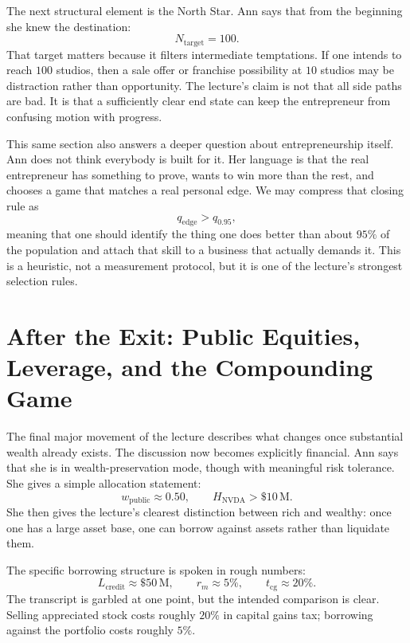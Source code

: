 The next structural element is the North Star. Ann says that from the beginning she knew the destination:
\begin{equation}
N_{\mathrm{target}} = 100.
\end{equation}
That target matters because it filters intermediate temptations. If one intends to reach \(100\) studios, then a sale offer or franchise possibility at \(10\) studios may be distraction rather than opportunity. The lecture's claim is not that all side paths are bad. It is that a sufficiently clear end state can keep the entrepreneur from confusing motion with progress.

This same section also answers a deeper question about entrepreneurship itself. Ann does not think everybody is built for it. Her language is that the real entrepreneur has something to prove, wants to win more than the rest, and chooses a game that matches a real personal edge. We may compress that closing rule as
\begin{equation}
q_{\mathrm{edge}} > q_{0.95},
\end{equation}
meaning that one should identify the thing one does better than about \(95\%\) of the population and attach that skill to a business that actually demands it. This is a heuristic, not a measurement protocol, but it is one of the lecture's strongest selection rules.

\section{After the Exit: Public Equities, Leverage, and the Compounding Game}

The final major movement of the lecture describes what changes once substantial wealth already exists. The discussion now becomes explicitly financial. Ann says that she is in wealth-preservation mode, though with meaningful risk tolerance. She gives a simple allocation statement:
\begin{equation}
w_{\mathrm{public}} \approx 0.50,
\qquad
H_{\mathrm{NVDA}} > \$10\,\mathrm{M}.
\end{equation}
She then gives the lecture's clearest distinction between rich and wealthy: once one has a large asset base, one can borrow against assets rather than liquidate them.

The specific borrowing structure is spoken in rough numbers:
\begin{equation}
L_{\mathrm{credit}} \approx \$50\,\mathrm{M},
\qquad
r_m \approx 5\%,
\qquad
t_{\mathrm{cg}} \approx 20\%.
\end{equation}
The transcript is garbled at one point, but the intended comparison is clear. Selling appreciated stock costs roughly \(20\%\) in capital gains tax; borrowing against the portfolio costs roughly \(5\%\).

